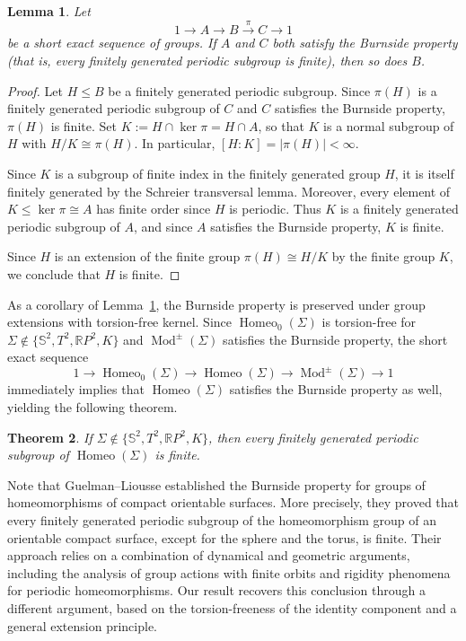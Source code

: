 \documentclass[12pt,a4paper]{amsart}
\numberwithin{equation}{section}
\DeclareMathOperator{\Mod}{Mod}
\DeclareMathOperator{\Homeo}{Homeo}
\theoremstyle{plain}
\newtheorem{theorem}{Theorem}
\newtheorem{lemma}[theorem]{Lemma}
\theoremstyle{definition}
\theoremstyle{remark}
\begin{document}
\begin{lemma} \label{lem:group}
Let \[1 \to A \rightarrow B \xrightarrow{\pi} C \to 1\] be a short exact sequence of groups.
If $A$ and $C$ both satisfy the Burnside property (that is, every finitely generated periodic subgroup is finite), then so does $B$.
\end{lemma}

\begin{proof}
Let $H \leq B$ be a finitely generated periodic subgroup.
Since $\pi(H)$ is a finitely generated periodic subgroup of $C$ and $C$ satisfies the Burnside property, $\pi(H)$ is finite.
Set $K := H \cap \ker \pi = H \cap A$, so that $K$ is a normal subgroup of $H$ with $H/K \cong \pi(H)$.
In particular, $[H : K] = |\pi(H)| < \infty$.

Since $K$ is a subgroup of finite index in the finitely generated group $H$, it is itself finitely generated by the Schreier transversal lemma.
Moreover, every element of $K \leq \ker\pi \cong A$ has finite order since $H$ is periodic.
Thus $K$ is a finitely generated periodic subgroup of $A$, and since $A$ satisfies the Burnside property, $K$ is finite.

Since $H$ is an extension of the finite group $\pi(H) \cong H/K$ by the finite group $K$, we conclude that $H$ is finite.
\end{proof}

As a corollary of Lemma~\ref{lem:group}, the Burnside property is preserved under group extensions with torsion-free kernel.
Since $\Homeo_0(\Sigma)$ is torsion-free for $\Sigma \notin \{\mathbb{S}^2, T^2, \mathbb{R}P^2, K\}$ and $\Mod^\pm(\Sigma)$ satisfies the Burnside property, the short exact sequence
\[
    1 \to \Homeo_0(\Sigma) \to \Homeo(\Sigma) \to \Mod^\pm(\Sigma) \to 1
\]
immediately implies that $\Homeo(\Sigma)$ satisfies the Burnside property as well, yielding the following theorem.

\begin{theorem} \label{thm:burnside}
If $\Sigma \notin \{ \mathbb{S}^2, T^2, \mathbb{R}P^2, K \}$, then every finitely generated periodic subgroup of $\Homeo(\Sigma)$ is finite.
\end{theorem}

Note that Guelman--Liousse \cite{MR3712338} established the Burnside property for groups of homeomorphisms of compact orientable surfaces. More precisely, they proved that every finitely generated periodic subgroup of the homeomorphism group of an orientable compact surface, except for the sphere and the torus, is finite. Their approach relies on a combination of dynamical and geometric arguments, including the analysis of group actions with finite orbits and rigidity phenomena for periodic homeomorphisms. Our result recovers this conclusion through a different argument, based on the torsion-freeness of the identity component and a general extension principle.
\end{document}
